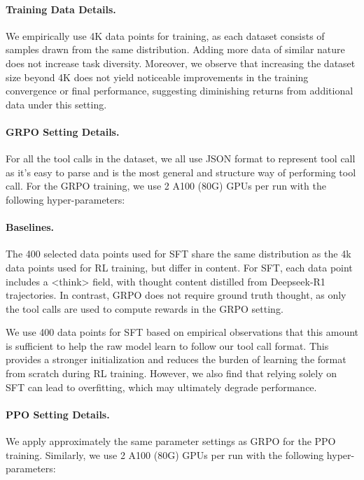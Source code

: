 \paragraph{Training Data Details.} We empirically use 4K data points for training, as each dataset consists of samples drawn from the same distribution. Adding more data of similar nature does not increase task diversity. Moreover, we observe that increasing the dataset size beyond 4K does not yield noticeable improvements in the training convergence or final performance, suggesting diminishing returns from additional data under this setting.

\paragraph{GRPO Setting Details.} For all the tool calls in the dataset, we all use JSON format to represent tool call as it's easy to parse and is the most general and structure way of performing tool call. For the GRPO training, we use 2 A100 (80G) GPUs per run with the following hyper-parameters:



\paragraph{Baselines.} The 400 selected data points used for SFT share the same distribution as the 4k data points used for RL training, but differ in content. For SFT, each data point includes a \textcolor{deepblue}{\textless{}think\textgreater{}} field, with thought content distilled from Deepseek-R1 trajectories. In contrast, GRPO does not require ground truth thought, as only the tool calls are used to compute rewards in the GRPO setting.

We use 400 data points for SFT based on empirical observations that this amount is sufficient to help the raw model learn to follow our tool call format. This provides a stronger initialization and reduces the burden of learning the format from scratch during RL training. However, we also find that relying solely on SFT can lead to overfitting, which may ultimately degrade performance.

\paragraph{PPO Setting Details.} We apply approximately the same parameter settings as GRPO for the PPO training. Similarly, we use 2 A100 (80G) GPUs per run with the following hyper-parameters:

